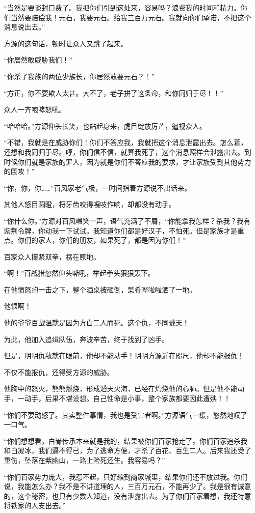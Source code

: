 \begin{this_body}
“当然是要谈封口费了。我把你们引到这处来，容易吗？浪费我的时间和精力。你们当然要赔偿我！元石，我要元石。给我三百万元石。我就向你们承诺，不把这个消息说出去。”

方源的这句话，顿时让众人又跳了起来。

“你居然敢威胁我们！”

“你杀了我族的两位少族长，你居然敢要元石？！”

“方正，你不要欺人太甚。大不了，老子拼了这条命，和你同归于尽！！”

众人一齐咆哮怒吼。

“哈哈哈。”方源仰头长笑，也站起身来，虎目绽放厉芒，逼视众人。

“不错，我就是在威胁你们！你们不答应我，我就把这个消息泄露出去。怎么着，还想和我同归于尽。哼，你们信不信，就算我死了，这个消息照样会泄露出去。到时候你们就是家族的罪人，因为就是你们不答应我的要求，才让家族受到其他势力的围攻！”

“你，你，你……”百风家老气极，一时间指着方源说不出话来。

其他人怒目圆瞪，将牙齿咬得嘎吱作响，却都没有动手。

“你什么你。”方源对百风嗤笑一声，语气充满了不屑，“你能拿我怎样？杀我？我有紫荆令牌，你动我一下试试。我知道你们都是好汉子，不怕死。但是家族才是重点。你们的家人，你们的朋友，如果死了，都是因为你们！”

百家众人攥紧双拳，楞在原地。

“啊！”百战猎忽然仰头嘶吼，举起拳头狠狠轰下。

在他愤怒的一击之下，整个酒桌被砸倒，菜肴哗啦啦洒了一地。

他恨啊！

他的爷爷百战温就是因为方白二人而死。这个仇，不同戴天！

为此，他加入追缉队伍，奔波辛苦，终于找到了凶手。

但是，明明仇敌就在眼前，他却不能动手！明明方源近在咫尺，他却不能报仇！

不仅不能报仇，还得受方源的威胁。

他胸中的怒火，熊熊燃烧，形成滔天火海，已经在灼烧他的心肺。但是他不能动手，一动手，后果不堪设想。自己性命是小事，整个家族都要因此遭殃！！

“你们不要动怒了。其实整件事情，我也是受害者啊。”方源语气一缓，悠然地叹了一口气。

“你们想想看，白骨传承本来就是我的，结果被你们百家抢走了。你们百家追杀我和白凝冰，我们逼不得已，为了逃命方便，才杀了百花、百生二人。后来我还受了重伤，坠落在紫幽山，一路上险死还生。我容易吗？”

“你们百家势力庞大，我惹不起。只好缩到商家城里，结果你们还不放过我。你们说，我能怎么办？我不是不讲道理的人，三百万元石，不能再少了。我是很有诚意的，这个秘密，也只有少数人知道，没有泄露出去。为了你们百家着想，我还特意将铁家的人支出去。”


\end{this_body}
